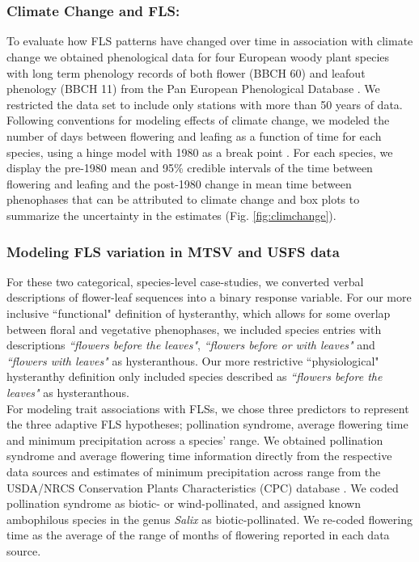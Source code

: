 \documentclass[11pt]{article}
\begin{document}
\pagebreak[4]

\section*{}\label{Methods S1}

\subsubsection*{Climate Change and FLS:}
\noindent To evaluate how FLS patterns have changed over time in association with climate change we obtained phenological data for four European woody plant species with long term phenology records of both flower (BBCH 60) and leafout phenology (BBCH 11) from the Pan European Phenological Database \citep{PEP725}. We restricted the data set to include only stations with more than 50 years of data. Following conventions for modeling effects of climate change, we modeled the number of days between flowering and leafing as a function of time for each species, using a hinge model with 1980 as a break point \citep{IPCC2013,Kharouba2018}. For each species, we display the pre-1980 mean and 95\% credible intervals of the time between flowering and leafing and the post-1980 change in mean time between phenophases that can be attributed to climate change and box plots to summarize the uncertainty in the estimates (Fig. \ref{fig:climchange}).

\subsubsection*{Modeling FLS variation in MTSV and USFS data}
\noindent For these two categorical, species-level case-studies, we converted verbal descriptions of flower-leaf sequences into a binary response variable. For our more inclusive ``functional" definition of hysteranthy, which allows for some overlap between floral and vegetative phenophases, we included species entries with descriptions \textit{``flowers before the leaves"}, \textit{``flowers before or with leaves"} and \textit{``flowers with leaves"} as hysteranthous. Our more restrictive ``physiological" hysteranthy definition only included species described as \textit{``flowers before the leaves"} as hysteranthous.\\

\noindent For modeling trait associations with FLSs, we chose three predictors to represent the three adaptive FLS hypotheses; pollination syndrome, average flowering time and minimum precipitation across a species' range. We obtained pollination syndrome and average flowering time information directly from the respective data sources and estimates of minimum precipitation across range from the USDA/NRCS Conservation Plants Characteristics (CPC) database \citep{usdancrs}. We coded pollination syndrome as biotic- or wind-pollinated, and assigned known ambophilous species in the genus \textit{Salix} as biotic-pollinated. We re-coded flowering time as the average of the range of months of flowering reported in each data source.\\
\end{document}
